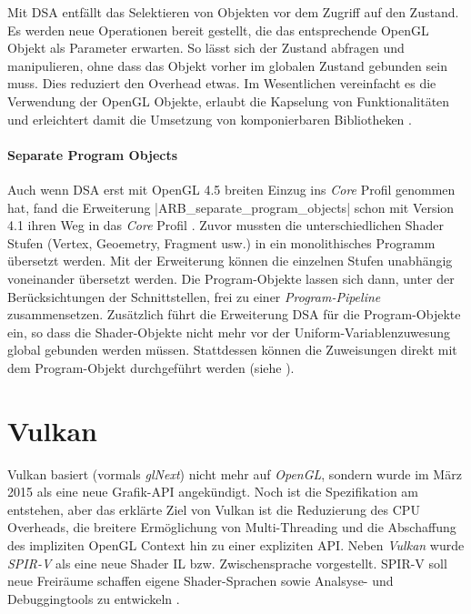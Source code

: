 Mit \ac{DSA} entfällt das Selektieren von Objekten vor dem Zugriff auf den Zustand. Es werden neue Operationen bereit gestellt, die das entsprechende OpenGL Objekt als Parameter erwarten. So lässt sich der Zustand abfragen und manipulieren, ohne dass das Objekt vorher im globalen Zustand gebunden sein muss. Dies reduziert den Overhead etwas. Im Wesentlichen vereinfacht es die Verwendung der OpenGL Objekte, erlaubt die Kapselung von Funktionalitäten und erleichtert damit die Umsetzung von komponierbaren Bibliotheken .

\paragraph{Separate Program Objects} Auch wenn \ac{DSA} erst mit OpenGL 4.5 breiten Einzug ins \textit{Core} Profil genommen hat, fand die Erweiterung |ARB_separate_program_objects| schon mit Version 4.1 ihren Weg in das \textit{Core} Profil \parencite{Akeley2010}. Zuvor mussten die unterschiedlichen Shader Stufen (Vertex, Geoemetry, Fragment usw.) in ein monolithisches Programm übersetzt werden. Mit der Erweiterung können die einzelnen Stufen unabhängig voneinander übersetzt werden. Die Program-Objekte lassen sich dann, unter der Berücksichtungen der Schnittstellen, frei zu einer \textit{Program-Pipeline} zusammensetzen. Zusätzlich führt die Erweiterung \ac{DSA} für die Program-Objekte ein, so dass die Shader-Objekte nicht mehr vor der Uniform-Variablenzuwesung global gebunden werden müssen. Stattdessen können die Zuweisungen direkt mit dem Program-Objekt durchgeführt werden (siehe ).


\section{Vulkan}\label{sec:vulkan}

Vulkan basiert (vormals \textit{glNext}) nicht mehr auf \textit{OpenGL}, sondern wurde im März 2015 als eine neue Grafik-API angekündigt. Noch ist die Spezifikation am entstehen, aber das erklärte Ziel von Vulkan ist die Reduzierung des CPU Overheads, die breitere Ermöglichung von Multi-Threading und die Abschaffung des impliziten OpenGL Context hin zu einer expliziten API. Neben \textit{Vulkan} wurde \textit{SPIR-V} als eine neue Shader \ac{IL} bzw. Zwischensprache vorgestellt. SPIR-V soll neue Freiräume schaffen eigene Shader-Sprachen sowie Analsyse- und Debuggingtools zu entwickeln \parencite{Olson2015}.

